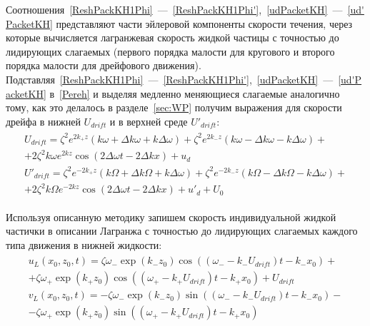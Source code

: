Соотношения~\eqref{ReshPackKH1Phi}~---~\eqref{ReshPackKH1Phi'},~\eqref{udPacketKH}~---~\eqref{ud'PacketKH}  представляют части эйлеровой компоненты скорости течения, через которые вычисляется лагранжевая скорость жидкой частицы с точностью до лидирующих слагаемых (первого порядка малости для кругового и второго порядка малости для дрейфового движения). Подставляя~\eqref{ReshPackKH1Phi}~---~\eqref{ReshPackKH1Phi'},~\eqref{udPacketKH}~---~\eqref{ud'PacketKH} в~\eqref{Pereh} и выделяя медленно меняющиеся слагаемые аналогично тому, как это делалось в разделе~\ref{sec:WP} получим выражения для скорости дрейфа в нижней $ U_{drift} $  и в верхней среде  $ U'_{drift} $:
\begin{gather}
\begin{gathered}
U_{drift}=\zeta^{2}e^{2k_{+}z}\left( k \omega +\Delta k \omega +k \Delta \omega \right) +\zeta^{2}e^{2k_{-}z}\left( k \omega -\Delta k \omega -k \Delta \omega \right)+\\
+ 2 \zeta^{2} k \omega e^{2 k z} \cos \left( 2 \Delta \omega t - 2 \Delta k x \right) + u_{d}\\
U'_{drift}=\zeta^{2}e^{-2k_{+}z}\left( k \Omega +\Delta k \Omega +k \Delta \omega \right) +\zeta^{2}e^{-2k_{-}z}\left( k \Omega -\Delta k \Omega -k \Delta \omega \right)+\\
+ 2 \zeta^{2} k \Omega e^{-2 k z} \cos \left( 2 \Delta \omega t - 2 \Delta k x \right) + u'_{d}+U_{0}
\label{UdriftPack}
\end{gathered}
\end{gather}
	  		  	
Используя описанную методику запишем скорость индивидуальной жидкой частички в описании Лагранжа с точностью до лидирующих слагаемых каждого типа движения в нижней жидкости:	\begin{gather}
\begin{gathered}
u_{L}\left( x_{0}, z_{0}, t \right)=\zeta \omega_{-}\exp \left( k_{-} z_{0}\right) \cos \left( \left( \omega_{-}-k_{-} U_{drift}\right) t - k_{-} x_{0} \right)+\\
+\zeta \omega_{+}\exp \left( k_{+} z_{0}\right) \cos \left( \left( \omega_{+}-k_{+} U_{drift}\right)  t - k_{+} x_{0} \right)+U_{drift}\\
v_{L}\left( x_{0}, z_{0}, t \right)=-\zeta \omega_{-}\exp \left( k_{-} z_{0}\right) \sin \left( \left( \omega_{-}-k_{-} U_{drift}\right) t - k_{-} x_{0} \right)-\\
-\zeta \omega_{+}\exp \left( k_{+} z_{0}\right) \sin \left( \left( \omega_{+}-k_{+} U_{drift}\right)  t - k_{+} x_{0} \right)
\label{ULPackKH}
\end{gathered}
\end{gather}	  	
	  	
